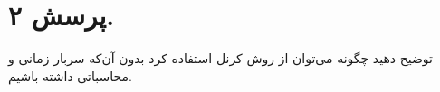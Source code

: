 \section{پرسش ۲.}
توضیح دهید چگونه می‌توان از روش کرنل استفاده کرد بدون آن‌که سربار زمانی و محاسباتی داشته باشیم.